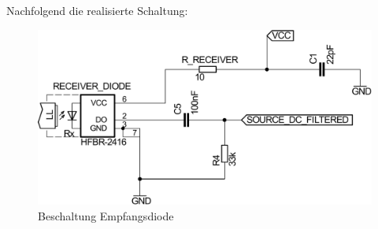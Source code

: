 \noindent
Nachfolgend die realisierte Schaltung:
\begin{figure}[htbp]
\centering
 \includegraphics[scale=0.45]{gfx/receiver_part.pdf}
	\caption{Beschaltung Empfangsdiode}
\end{figure}
 
 

